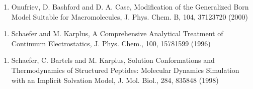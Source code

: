 \documentclass[letterpaper,11pt,english]{sphinxmanual}
\begin{document}
\begin{enumerate}
%
\item {} 
Onufriev, D. Bashford and D. A. Case, Modification of the Generalized Born Model Suitable for Macromolecules, J. Phys. Chem. B, 104, 3712\sphinxhyphen{}3720 (2000)

\end{enumerate}
\begin{enumerate}
%
\setcounter{enumi}{12}
\item {} 
Schaefer and M. Karplus, A Comprehensive Analytical Treatment of Continuum Electrostatics, J. Phys. Chem., 100, 1578\sphinxhyphen{}1599 (1996)

\end{enumerate}
\begin{enumerate}
%
\setcounter{enumi}{12}
\item {} 
Schaefer, C. Bartels and M. Karplus, Solution Conformations and Thermodynamics of Structured Peptides: Molecular Dynamics Simulation with an Implicit Solvation Model, J. Mol. Biol., 284, 835\sphinxhyphen{}848 (1998)

\end{enumerate}
\end{document}
